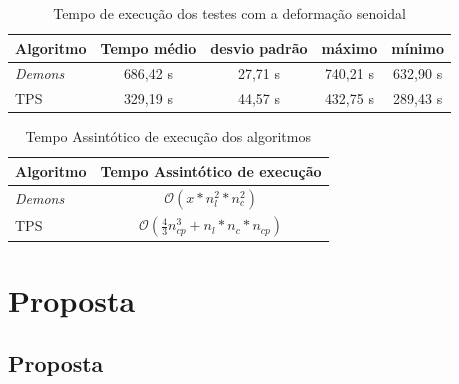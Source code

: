 \documentclass[t]{beamer}
\begin{document}
\begin{frame}
  \begin{table}[H]
    \begin{center}
      \begin{tabular}{|l|c|c|c|c|}
        \hline
        Algoritmo & Tempo médio & desvio padrão & máximo & mínimo \\
        \hline
        \textit{Demons} & 686,42 s & 27,71 s & 740,21 s & 632,90 s \\
        \hline
        TPS & 329,19 s & 44,57 s & 432,75 s & 289,43 s \\
        \hline
      \end{tabular}
      \caption{Tempo de execução dos testes com a deformação senoidal}
      \label{table:tps}
    \end{center}
  \end{table}
  \begin{table}[H]
    \begin{center}
      \begin{tabular}{|l|c|}
        \hline
        Algoritmo & Tempo Assintótico de execução \\
        \hline
        \textit{Demons} &$\mathcal{O}(x*n_l^2*n_c^2)$ \\
        \hline
        TPS             &$\mathcal{O}(\frac{4}{3}n_{cp}^3+n_l*n_c*n_{cp})$\\
        \hline
      \end{tabular}
      \caption{Tempo Assintótico de execução dos algoritmos}
      \label{table:tps}
    \end{center}
  \end{table}
\end{frame}

\section{Proposta}
\subsection{Proposta}
\end{document}
